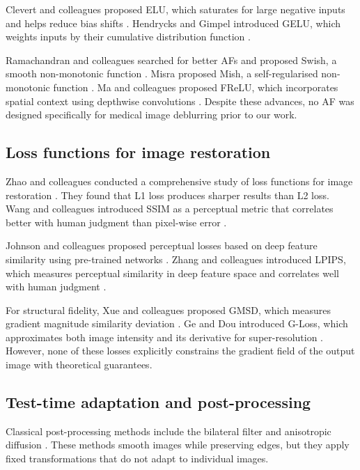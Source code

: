 Clevert and colleagues proposed ELU, which saturates for large negative inputs and helps reduce bias shifts \citep{clevert2015fast}. Hendrycks and Gimpel introduced GELU, which weights inputs by their cumulative distribution function \citep{hendrycks2016gaussian}.

Ramachandran and colleagues searched for better AFs and proposed Swish, a smooth non-monotonic function \citep{ramachandran2017searching}. Misra proposed Mish, a self-regularised non-monotonic function \citep{misra2019mish}. Ma and colleagues proposed FReLU, which incorporates spatial context using depthwise convolutions \citep{ma2020funnel}. Despite these advances, no AF was designed specifically for medical image deblurring prior to our work.

\subsection{Loss functions for image restoration}

Zhao and colleagues conducted a comprehensive study of loss functions for image restoration \citep{zhao2016loss}. They found that L1 loss produces sharper results than L2 loss. Wang and colleagues introduced SSIM as a perceptual metric that correlates better with human judgment than pixel-wise error \citep{wang2004image}.

Johnson and colleagues proposed perceptual losses based on deep feature similarity using pre-trained networks \citep{johnson2016perceptual}. Zhang and colleagues introduced LPIPS, which measures perceptual similarity in deep feature space and correlates well with human judgment \citep{zhang2018unreasonable}.

For structural fidelity, Xue and colleagues proposed GMSD, which measures gradient magnitude similarity deviation \citep{xue2013gradient}. Ge and Dou introduced G-Loss, which approximates both image intensity and its derivative for super-resolution \citep{ge2023loss}. However, none of these losses explicitly constrains the gradient field of the output image with theoretical guarantees.

\subsection{Test-time adaptation and post-processing}

Classical post-processing methods include the bilateral filter \citep{tomasi1998bilateral} and anisotropic diffusion \citep{perona1990scale}. These methods smooth images while preserving edges, but they apply fixed transformations that do not adapt to individual images.

